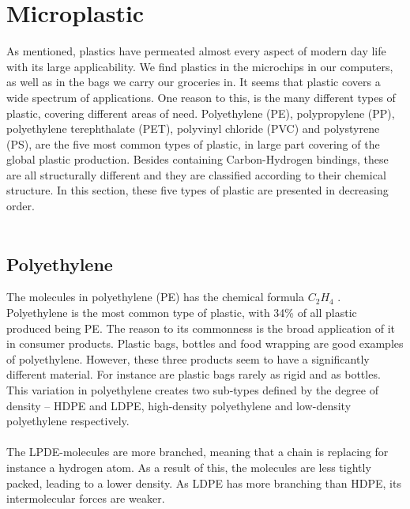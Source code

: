 \vspace{1.3cm}
\section{Microplastic}
As mentioned, plastics have permeated almost every aspect of modern day life with its large applicability. We find plastics in the microchips in our computers, as well as in the bags we carry our groceries in. It seems that plastic covers a wide spectrum of applications.  One reason to this, is the many different types of plastic, covering different areas of need. Polyethylene (PE), polypropylene (PP), polyethylene terephthalate (PET), polyvinyl chloride (PVC) and polystyrene (PS), are the five most common types of plastic, in large part covering of the global plastic production. Besides containing Carbon-Hydrogen bindings, these are all structurally different and they are classified according to their chemical structure. In this section, these five types of plastic are presented in decreasing order. 
\\\\

\subsection{Polyethylene}
The molecules in polyethylene (PE) has the chemical formula $C_2H_4$ . Polyethylene is the most common type of plastic, with 34\% of all plastic produced being PE. The reason to its commonness is the broad application of it in consumer products. Plastic bags, bottles and food wrapping are good examples of polyethylene. However, these three products seem to have a significantly different material. For instance are plastic bags rarely as rigid and as bottles. This variation in polyethylene creates two sub-types defined by the degree of density – HDPE and LDPE, high-density polyethylene and low-density polyethylene respectively. 
\\\\
The LPDE-molecules are more branched, meaning that a chain is replacing for instance a hydrogen atom. As a result of this, the molecules are less tightly packed, leading to a lower density.  As LDPE has more branching than HDPE, its intermolecular forces are weaker. 


